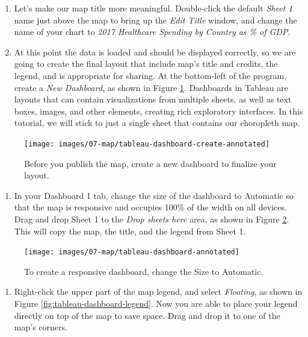 \documentclass[
  english,
]{book}
\providecommand{\tightlist}{%
  \setlength{\itemsep}{0pt}\setlength{\parskip}{0pt}}
\begin{document}
\begin{enumerate}
\def\labelenumi{\arabic{enumi}.}
\setcounter{enumi}{8}
\item
  Let's make our map title more meaningful. Double-click the default \emph{Sheet 1} name just above the map
  to bring up the \emph{Edit Title} window, and change the name of your chart to
  \emph{2017 Healthcare Spending by Country as \% of GDP}.
\item
  At this point the data is loaded and should be displayed correctly, so we are going to create the final layout that include map's title and credits, the legend, and is appropriate for sharing. At the bottom-left of the program, create a \emph{New Dashboard}, as shown in Figure \ref{fig:tableau-dashboard-create}. Dashboards in Tableau are layouts that can contain visualizations from multiple sheets, as well as text boxes, images, and other elements, creating rich exploratory interfaces. In this tutorial, we will stick to just a single sheet that contains our choropleth map.
\end{enumerate}



\begin{figure}
\texttt{[image: images/07-map/tableau-dashboard-create-annotated]} \caption{Before you publish the map, create a new dashboard to finalize your layout.}\label{fig:tableau-dashboard-create}
\end{figure}

\begin{enumerate}
\def\labelenumi{\arabic{enumi}.}
\setcounter{enumi}{10}
\tightlist
\item
  In your Dashboard 1 tab, change the size of the dashboard to Automatic so that the map is responsive and occupies 100\% of the width on all devices. Drag and drop Sheet 1 to the \emph{Drop sheets here} area, as shown in Figure \ref{fig:tableau-dashboard}. This will copy the map, the title, and the legend from Sheet 1.
\end{enumerate}



\begin{figure}
\texttt{[image: images/07-map/tableau-dashboard-annotated]} \caption{To create a responsive dashboard, change the Size to Automatic.}\label{fig:tableau-dashboard}
\end{figure}

\begin{enumerate}
\def\labelenumi{\arabic{enumi}.}
\setcounter{enumi}{11}
\tightlist
\item
  Right-click the upper part of the map legend, and select \emph{Floating}, as shown in Figure \ref{fig:tableau-dashboard-legend}. Now you are able to place your legend directly on top of the map to save space. Drag and drop it to one of the map's corners.
\end{enumerate}
\end{document}
